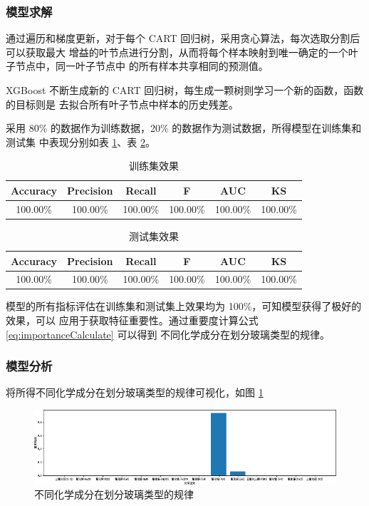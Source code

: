 \documentclass[withoutpreface,bwprint]{cumcmthesis} %
\begin{document}
\subsubsection{模型求解}
通过遍历和梯度更新，对于每个 CART 回归树，采用贪心算法，每次选取分割后可以获取最大
增益的叶节点进行分割，从而将每个样本映射到唯一确定的一个叶子节点中，同一叶子节点中
的所有样本共享相同的预测值。

XGBoost 不断生成新的 CART 回归树，每生成一颗树则学习一个新的函数，函数的目标则是
去拟合所有叶子节点中样本的历史残差。

采用 80\% 的数据作为训练数据，20\% 的数据作为测试数据，所得模型在训练集和测试集
中表现分别如表 \ref{tab:train}、表 \ref{tab:test}。
\begin{table}[!htb]
    \centering
    \begin{tabular}{|c|c|c|c|c|c|}
        \hline
        Accuracy & Precision & Recall   & F        & AUC      & KS       \\
        \hline
        100.00\% & 100.00\%  & 100.00\% & 100.00\% & 100.00\% & 100.00\% \\
        \hline
    \end{tabular}
    \caption{训练集效果}
    \label{tab:train}
\end{table}
\begin{table}[!htb]
    \centering
    \begin{tabular}{|c|c|c|c|c|c|}
        \hline
        Accuracy & Precision & Recall   & F        & AUC      & KS       \\
        \hline
        100.00\% & 100.00\%  & 100.00\% & 100.00\% & 100.00\% & 100.00\% \\
        \hline
    \end{tabular}
    \caption{测试集效果}
    \label{tab:test}
\end{table}

模型的所有指标评估在训练集和测试集上效果均为 100\%，可知模型获得了极好的效果，可以
应用于获取特征重要性。通过重要度计算公式 \eqref{eq:importanceCalculate} 可以得到
不同化学成分在划分玻璃类型的规律。

\subsubsection{模型分析}
将所得不同化学成分在划分玻璃类型的规律可视化，如图 \ref{fig:visual0}
\begin{figure}[!htb]
    \centering
    \includegraphics{不同化学成分在划分玻璃类型的规律.pdf}
    \caption{不同化学成分在划分玻璃类型的规律}
    \label{fig:visual0}
\end{figure}
\end{document}
